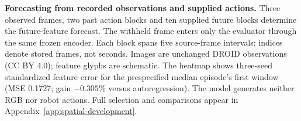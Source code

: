 \textbf{Forecasting from recorded observations and supplied actions.} Three observed frames, two past action blocks and ten supplied future blocks determine the future-feature forecast. The withheld frame enters only the evaluator through the same frozen encoder. Each block spans five source-frame intervals; indices denote stored frames, not seconds. Images are unchanged DROID observations (CC BY 4.0); feature glyphs are schematic. The heatmap shows three-seed standardized feature error for the prespecified median episode's first window (MSE 0.1727; gain $-0.305\%$ versus autoregression). The model generates neither RGB nor robot actions. Full selection and comparisons appear in Appendix~\ref{app:spatial-development}.
